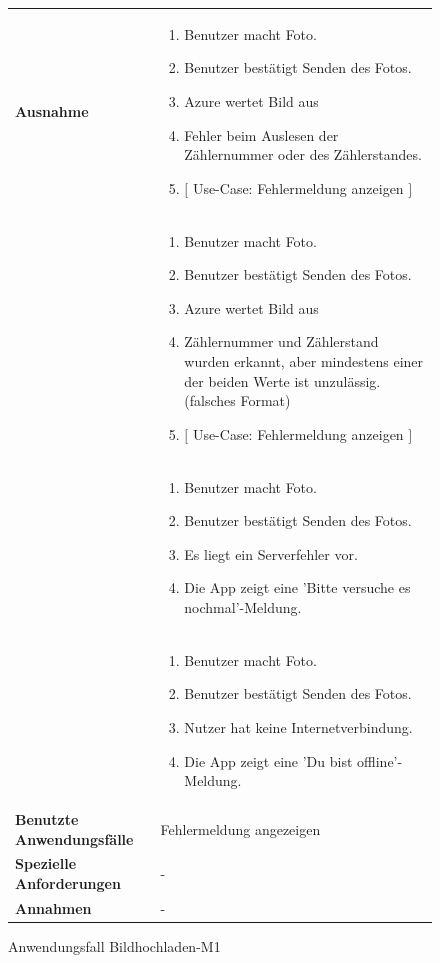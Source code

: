 \begin{figure}[h]
	\centering
	\begin{tabularx}{\textwidth}{ X | X }
	 \hline
		\textbf{Ausnahme} &
		\begin{enumerate}
			\item Benutzer macht Foto.
			\item Benutzer bestätigt Senden des Fotos.
			\item Azure wertet Bild aus
			\item Fehler beim Auslesen der Zählernummer oder des Zählerstandes.
			\item $\lbrack$ Use-Case: Fehlermeldung anzeigen $\rbrack$
		\end{enumerate} \\ &
		\begin{enumerate}
			\item Benutzer macht Foto.
			\item Benutzer bestätigt Senden des Fotos.
			\item Azure wertet Bild aus
			\item Zählernummer und Zählerstand wurden erkannt, aber mindestens einer der beiden Werte ist unzulässig. (falsches Format)
			\item $\lbrack$ Use-Case: Fehlermeldung anzeigen $\rbrack$
		\end{enumerate} \\  &
		\begin{enumerate}
			\item Benutzer macht Foto.
			\item Benutzer bestätigt Senden des Fotos.
			\item Es liegt ein Serverfehler vor.
			\item Die App zeigt eine 'Bitte versuche es nochmal'-Meldung.
		\end{enumerate} \\  &
		\begin{enumerate}
			\item Benutzer macht Foto.
			\item Benutzer bestätigt Senden des Fotos.
			\item Nutzer hat keine Internetverbindung.
			\item Die App zeigt eine 'Du bist offline'-Meldung.
		\end{enumerate} \\ \hline
		\textbf{Benutzte Anwendungsfälle} & Fehlermeldung angezeigen \\ \hline
		\textbf{Spezielle Anforderungen} & - \\ \hline
		\textbf{Annahmen} & -
	\end{tabularx}
	\caption{Anwendungsfall Bildhochladen-M1}
	\label{fig:anwendungsfall-server-tabelle-xx-1}
\end{figure}

